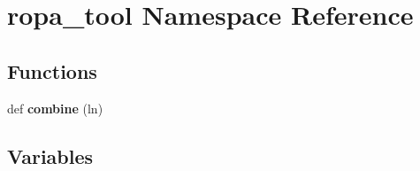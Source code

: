 \hypertarget{namespaceropa__tool}{}\section{ropa\+\_\+tool Namespace Reference}
\label{namespaceropa__tool}
\subsection*{Functions}
\begin{DoxyCompactItemize}
\item 
\mbox{\label{namespaceropa__tool_a21c67d02dd7076de296b4d7ebaa523a3}} 
def {\bfseries combine} (ln)
\end{DoxyCompactItemize}
\subsection*{Variables}
